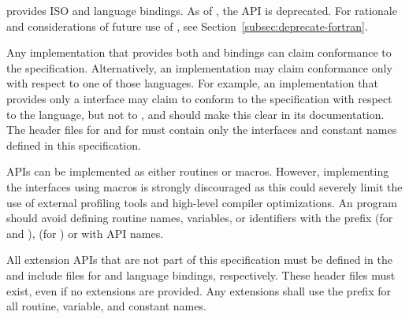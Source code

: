 \openshmem provides ISO \Cstd and \Fortran[90] language bindings.
As of \openshmem[1.4], the \Fortran API is deprecated.
For rationale and considerations of
future \Fortran use of \openshmem, see Section~\ref{subsec:deprecate-fortran}.

Any implementation that provides both \Cstd and \Fortran bindings can claim
conformance to the specification. Alternatively, an implementation may claim
conformance only with respect to one of those languages. For example,
an implementation that provides only a
\Cstd interface may claim to conform to the \openshmem specification with
respect to the \Cstd language, but not to \Fortran, and should make this
clear in its documentation. The \openshmem header files  for
\Cstd and  for
\Fortran must contain only the interfaces and constant names defined in this
specification.

\openshmem \acp{API} can be implemented as either routines or macros. However,
implementing the interfaces using macros is strongly discouraged as this could
severely limit the use of external profiling tools and high-level compiler
optimizations. An \openshmem program should avoid defining routine names,
variables, or identifiers with the prefix \shmemprefix (for \Cstd and
\Fortran), \shmemprefixC (for \Cstd) or with \openshmem \ac{API} names.

All \openshmem extension \acp{API} that are not part of this specification must
be defined in the  and  include files for
\Cstd and \Fortran language bindings, respectively.  These header files
must exist, even if no extensions are provided.  Any extensions shall use the
 prefix for all routine, variable, and constant names.
